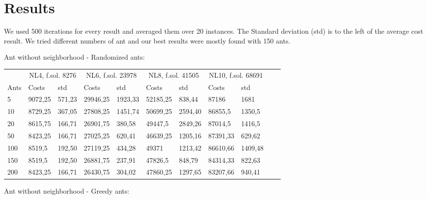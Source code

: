 \section{Results}

We used 500 iterations for every result and averaged them over 20 instances. The
Standard deviation (std) is to the left of the average cost result. We tried
different numbers of ant and our best results were mostly found with 150 ants.

Ant without neighborhood - Randomized ants:
\newline
\begin{minipage}[b]{1.0\textwidth}
    \begin{tabular}{ l | ll | ll | ll | ll | ll}
	\hline
	& \multicolumn{2}{c}{NL4, f.sol. 8276} & \multicolumn{2}{c}{NL6, f.sol. 23978}
	& \multicolumn{2}{c}{NL8, f.sol. 41505} & \multicolumn{2}{c}{NL10, f.sol. 68691} \\
	\cline{1-9}
	Ants & Costs & std & Costs & std & Costs & std & Costs & std \\
	\hline
	5     &  9072,25    & 571,23 &  29946,25    & 1923,33 &  52185,25   & 838,44 &  87186    & 1681 \\
	10    &  8729,25    & 367,05 &  27808,25    & 1451,74 &  50699,25   & 2594,40 &  86855,5    & 1350,5 \\
	20    &  8615,75    & 166,71 &  26901,75    & 380,58 &  49447,5    & 2849,26 &  87014,5    & 1416,5 \\
	50    &  8423,25    & 166,71 &  27025,25    & 620,41 &  46639,25   & 1205,16 &  87391,33    & 629,62 \\
	100   &  8519,5    & 192,50 &  27119,25    & 434,28 &  49371      & 1213,42 &  86610,66    & 1409,48 \\
	150   &  8519,5    & 192,50 &  26881,75    & 237,91 &  47826,5    & 848,79 &  84314,33    & 822,63 \\
	200   &  8423,25    & 166,71 &  26430,75    & 304,02 &  47860,25   & 1297,65 &  83207,66    & 940,41 \\
	\hline
	\end{tabular}
\end{minipage}
\newline
Ant without neighborhood - Greedy ants:
\newline
